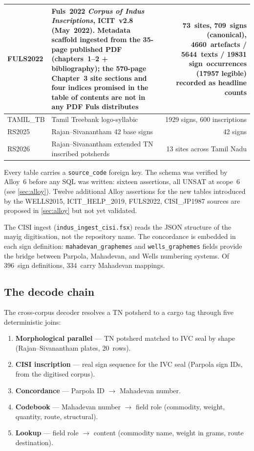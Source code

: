 \begin{longtable}{@{}llr@{}}
\midrule
FULS2022 & Fuls~2022 \textit{Corpus of Indus
  Inscriptions},\smartcite{Fuls2022} ICIT~v2.8 (May~2022). Metadata
  scaffold ingested from the 35-page published PDF (chapters~1--2 +
  bibliography); the 570-page Chapter~3 site sections and four indices
  promised in the table of contents are not in any PDF Fuls distributes
     & 73~sites, 709~signs (canonical), 4660~artefacts / 5644~texts /
       19831 sign~occurrences (17957 legible) recorded as
       headline counts \\
\midrule
TAMIL\_TB & Tamil Treebank logo-syllabic & \num{1929} signs, \num{600} inscriptions \\
\midrule
RS2025 & Rajan--Sivanantham 42 base signs & \num{42} signs \\
\midrule
RS2026 & Rajan--Sivanantham extended TN inscribed potsherds & 13 sites
  across Tamil Nadu \\
\end{longtable}

\noindent
Every table carries a \texttt{source\_code} foreign key.
The schema was verified by Alloy~6 before any SQL was written:
sixteen assertions, all UNSAT at scope~6
(see \cref{sec:alloy}).
Twelve additional Alloy assertions for the new tables introduced by the
WELLS2015, ICIT\_HELP\_2019, FULS2022, CISI\_JP1987 sources are
proposed in \cref{sec:alloy} but not yet validated.

The CISI ingest (\texttt{indus\_ingest\_cisi.fsx}) reads the
JSON structure of the mayig digitisation, not the repository name.
The concordance is embedded in each sign definition:
\texttt{mahadevan\_graphemes} and \texttt{wells\_graphemes} fields
provide the bridge between Parpola, Mahadevan, and Wells numbering
systems. Of 396~sign definitions, 334~carry Mahadevan mappings.

\subsection{The decode chain}

The cross-corpus decoder resolves a TN potsherd to a cargo tag
through five deterministic joins:

\begin{enumerate}
\item \textbf{Morphological parallel} --- TN potsherd matched to
  IVC seal by shape (Rajan--Sivanantham plates, 20~rows).
\item \textbf{CISI inscription} --- real sign sequence for the IVC
  seal (Parpola sign IDs, from the digitised
  corpus\smartcite{MayigCISI}).
\item \textbf{Concordance} --- Parpola ID $\to$ Mahadevan
  number.\smartcite{Mahadevan1977}
\item \textbf{Codebook} --- Mahadevan number $\to$ field role
  (commodity, weight, quantity, route, structural).
\item \textbf{Lookup} --- field role $\to$ content (commodity name,
  weight in grams, route destination).
\end{enumerate}

